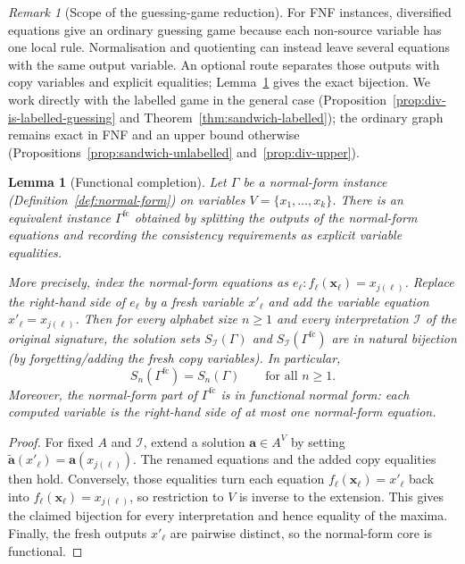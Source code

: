 \documentclass[11pt]{article}
\theoremstyle{plain}
\newtheorem{lemma}[theorem]{Lemma}
\theoremstyle{definition}
\theoremstyle{definition}
\theoremstyle{remark}
\newtheorem{remark}[theorem]{Remark}
\newcommand{\A}{A}
\newcommand{\Sn}{S_n}
\begin{document}
\begin{remark}[Scope of the guessing-game reduction]
\label{rem:scope}
For FNF instances, diversified equations give an ordinary guessing game because each non-source variable has one
local rule. Normalisation and quotienting can instead leave several equations with the same output variable.
An optional route separates those outputs with copy variables and explicit equalities;
Lemma~\ref{lem:functional-completion} gives the exact bijection. We work directly with the labelled game in
the general case (Proposition~\ref{prop:div-is-labelled-guessing} and Theorem~\ref{thm:sandwich-labelled}); the
ordinary graph remains exact in FNF and an upper bound otherwise (Propositions~\ref{prop:sandwich-unlabelled}
and~\ref{prop:div-upper}).
\end{remark}

\begin{lemma}[Functional completion]
\label{lem:functional-completion}
Let $\Gamma$ be a normal-form instance (Definition~\ref{def:normal-form}) on variables
$V=\{x_1,\dots,x_k\}$. There is an equivalent instance $\Gamma^{\mathrm{fc}}$ obtained by
splitting the outputs of the normal-form equations and recording the consistency requirements
as explicit variable equalities.

More precisely, index the normal-form equations as
$e_\ell:f_\ell(\mathbf x_\ell)=x_{j(\ell)}$. Replace the right-hand side of $e_\ell$ by a fresh
variable $x'_\ell$ and add the variable equation $x'_\ell=x_{j(\ell)}$.
Then for every alphabet size $n\ge 1$ and every interpretation $\mathcal I$ of the original
signature, the solution sets $S_{\mathcal I}(\Gamma)$ and $S_{\mathcal I}(\Gamma^{\mathrm{fc}})$
are in natural bijection (by forgetting/adding the fresh copy variables). In particular,
\[
\Sn(\Gamma^{\mathrm{fc}})=\Sn(\Gamma)\qquad\text{for all }n\ge 1.
\]
Moreover, the \emph{normal-form} part of $\Gamma^{\mathrm{fc}}$ is in functional normal form:
each computed variable is the right-hand side of at most one normal-form equation.
\end{lemma}

\begin{proof}
For fixed $\A$ and $\mathcal I$, extend a solution $\mathbf a\in \A^V$ by setting
$\widetilde{\mathbf a}(x'_\ell)=\mathbf a(x_{j(\ell)})$. The renamed equations and the added
copy equalities then hold. Conversely, those equalities turn each equation
$f_\ell(\mathbf x_\ell)=x'_\ell$ back into $f_\ell(\mathbf x_\ell)=x_{j(\ell)}$, so restriction
to $V$ is inverse to the extension. This gives the claimed bijection for every interpretation
and hence equality of the maxima. Finally, the fresh outputs $x'_\ell$ are pairwise distinct,
so the normal-form core is functional.
\end{proof}
\end{document}
